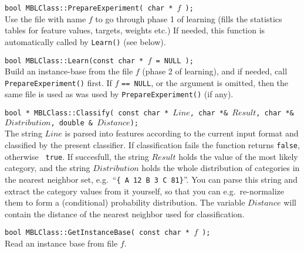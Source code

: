 \documentclass{report}
\begin{document}
\begin{description}

\item {\tt bool MBLClass::PrepareExperiment( char * $f$ );}\\ Use the
file with name $f$ to go through phase 1 of learning (fills the
statistics tables for feature values, targets, weights etc.)  If
needed, this function is automatically called by {\tt Learn()} (see
below).

\item {\tt bool MBLClass::Learn(const char * $f$ = NULL );}\\ 
Build an instance-base from the file $f$ (phase 2 of learning), and if
needed, call {\tt PrepareExperiment()} first. If $f$ {\tt == NULL}, or
the argument is omitted, then the same file is used as was used by
{\tt PrepareExperiment()} (if any).


\item {\tt bool * MBLClass::Classify( const char * $Line$, char *\& $Result$, char *\& $Distribution$, double \& $Distance$);}\\

The string $Line$ is parsed into features according to the current
input format and classified by the present classifier. If
classification fails the function returns {\tt false}, otherwise {\tt
true}. If succesfull, the string $Result$ holds the value of the most
likely category, and the string $Distribution$ holds the whole
distribution of categories in the nearest neighbor set, e.g.~``{\tt\{
A 12 B 3 C 81\}}''. You can parse this string and extract the category values
from it yourself, so that you can e.g.~re-normalize them to form a
(conditional) probability distribution. The variable $Distance$ will contain the distance
of the nearest neighbor used for classification.  

\item {\tt bool MBLClass::GetInstanceBase( const char * $f$ );}\\
Read an instance base from file $f$.


\end{description}
\end{document}

